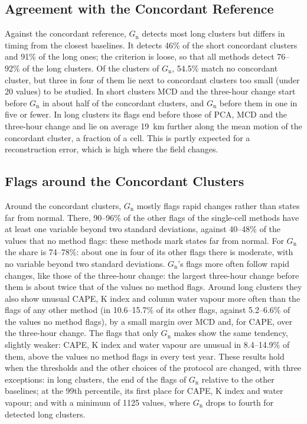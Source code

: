 \documentclass[11pt,a4paper]{article}
\newcommand{\Gn}{$G_{\mathrm{n}}$}
\begin{document}
\subsection{Agreement with the Concordant Reference}
Against the concordant reference, \Gn{} detects most long clusters but differs in timing from the closest baselines. It detects 46\% of the short concordant clusters and 91\% of the long ones; the criterion is loose, so that all methods detect 76--92\% of the long clusters. Of the clusters of \Gn, 54.5\% match no concordant cluster, but three in four of them lie next to concordant clusters too small (under 20 values) to be studied. In short clusters MCD and the three-hour change start before \Gn{} in about half of the concordant clusters, and \Gn{} before them in one in five or fewer. In long clusters its flags end before those of PCA, MCD and the three-hour change and lie on average 19~km further along the mean motion of the concordant cluster, a fraction of a cell. This is partly expected for a reconstruction error, which is high where the field changes.

\subsection{Flags around the Concordant Clusters}
Around the concordant clusters, \Gn{} mostly flags rapid changes rather than states far from normal. There, 90--96\% of the other flags of the single-cell methods have at least one variable beyond two standard deviations, against 40--48\% of the values that no method flags: these methods mark states far from normal. For \Gn{} the share is 74--78\%: about one in four of its other flags there is moderate, with no variable beyond two standard deviations. \Gn's flags more often follow rapid changes, like those of the three-hour change: the largest three-hour change before them is about twice that of the values no method flags. Around long clusters they also show unusual CAPE, K index and column water vapour more often than the flags of any other method (in 10.6--15.7\% of its other flags, against 5.2--6.6\% of the values no method flags), by a small margin over MCD and, for CAPE, over the three-hour change. The flags that only \Gn{} makes show the same tendency, slightly weaker: CAPE, K index and water vapour are unusual in 8.4--14.9\% of them, above the values no method flags in every test year. These results hold when the thresholds and the other choices of the protocol are changed, with three exceptions: in long clusters, the end of the flags of \Gn{} relative to the other baselines; at the 99th percentile, its first place for CAPE, K index and water vapour; and with a minimum of 1125 values, where \Gn{} drops to fourth for detected long clusters.
\end{document}

